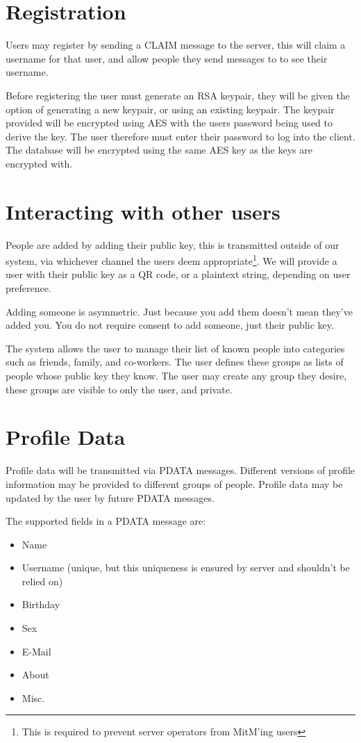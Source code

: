 \section{Registration}
Users may register by sending a CLAIM message to the server, this will claim a
username for that user, and allow people they send messages to to see their
username.

Before registering the user must generate an RSA keypair, they will be given the
option of generating a new keypair, or using an existing keypair. The keypair
provided will be encrypted using AES with the users password being used to
derive the key. The user therefore must enter their password to log into the
client. The database will be encrypted using the same AES key as the keys are
encrypted with.

\section{Interacting with other users}
People are added by adding their public key, this is transmitted outside of our
system, via whichever channel the users deem appropriate\footnote{This is
required to prevent server operators from MitM'ing users}. We will provide a
user with their public key as a QR code, or a plaintext string, depending on
user preference.

Adding someone is asymmetric. Just because you add them doesn't mean they've
added you. You do not require consent to add someone, just their public key.
    
The system allows the user to manage their list of known people into categories
such as friends, family, and co-workers. The user defines these groups as lists
of people whose public key they know. The user may create any group they desire,
these groups are visible to only the user, and private.

\section{Profile Data}
Profile data will be transmitted via PDATA messages. Different versions of
profile information may be provided to different groups of people. Profile data
may be updated by the user by future PDATA messages.

The supported fields in a PDATA message are:
    \begin{itemize}
        \item Name
        \item Username (unique, but this uniqueness is ensured by server and
              shouldn't be relied on)
        \item Birthday
        \item Sex
        \item E-Mail
        \item About
        \item Misc.
    \end{itemize}

